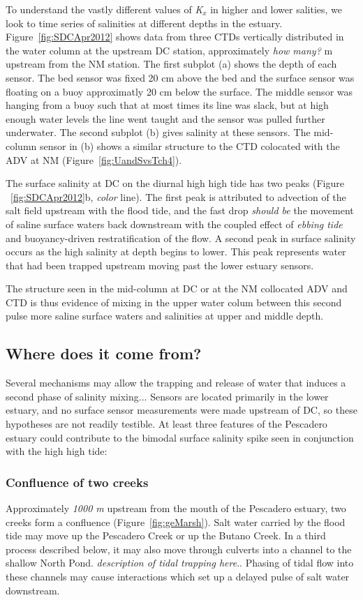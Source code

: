 To understand the vastly different values of \emph{K$_x$} in higher and lower salities, we look to time series of salinities at different depths in the estuary. Figure~\ref{fig:SDCApr2012} shows data from three CTDs vertically distributed in the water column at the upstream DC station, approximately \emph{how many?} m upstream from the NM station. The first subplot (a) shows the depth of each sensor. The bed sensor was fixed 20 cm above the bed and the surface sensor was floating on a buoy approximatly 20 cm below the surface. The middle sensor was hanging from a buoy such that at most times its line was slack, but at high enough water levels the line went taught and the sensor was pulled further underwater. The second subplot (b) gives salinity at these sensors. The mid-column sensor in (b) shows a similar structure to the CTD colocated with the ADV at NM (Figure~\ref{fig:UandSvsTch4}).

The surface salinity at DC on the diurnal high high tide has two peaks (Figure ~\ref{fig:SDCApr2012}b, \emph{color} line). The first peak is attributed to advection of the salt field upstream with the flood tide, and the fast drop \emph{should be} the movement of saline surface waters back downstream with the coupled effect of \emph{ebbing tide} and buoyancy-driven restratification of the flow. A second peak in surface salinity occurs as the high salinity at depth begins to lower. This peak represents water that had been trapped upstream moving past the lower estuary sensors. 

The structure seen in the mid-column at DC or at the NM collocated ADV and CTD is thus evidence of mixing in the upper water colum between this second pulse more saline surface waters and salinities at upper and middle depth. 

\subsection{Where does it come from?}

Several mechanisms may allow the trapping and release of water that induces a second phase of salinity mixing... Sensors are located primarily in the lower estuary, and no surface sensor measurements were made upstream of DC, so these hypotheses are not readily testible. At least three features of the Pescadero estuary could contribute to the bimodal surface salinity spike seen in conjunction with the high high tide:

\subsubsection{Confluence of two creeks}
Approximately \emph{1000 m} upstream from the mouth of the Pescadero estuary, two creeks form a confluence (Figure~\ref{fig:geMarsh}). Salt water carried by the flood tide may move up the Pescadero Creek or up the Butano Creek. In a third process described below, it may also move through culverts into a channel to the shallow North Pond. \emph{description of tidal trapping here}.. Phasing of tidal flow into these channels may cause interactions which set up a delayed pulse of salt water downstream. 

